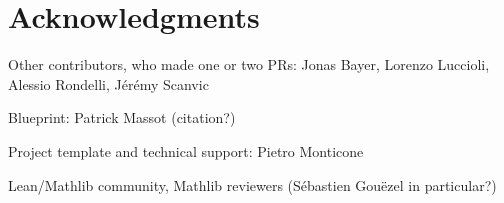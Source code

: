 \documentclass[lean]{Draft}
\begin{document}
\section*{Acknowledgments}

Other contributors, who made one or two PRs: Jonas Bayer, Lorenzo Luccioli, Alessio Rondelli, Jérémy Scanvic

Blueprint: Patrick Massot (citation?)

Project template \cite{Monticone_LeanProject_2025} and technical support: Pietro Monticone

Lean/Mathlib community, Mathlib reviewers (Sébastien Gouëzel in particular?)


\printbibliography
\end{document}
